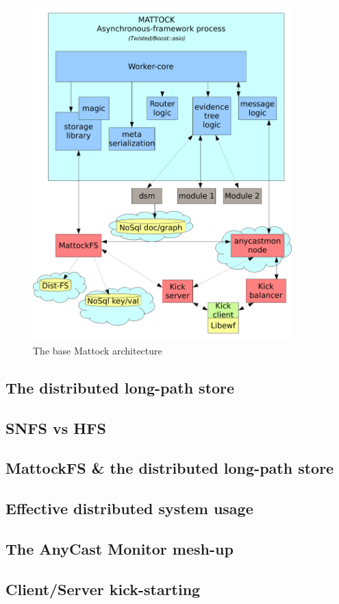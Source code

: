 \begin{figure}
\centering
\includegraphics[width=100mm]{mattock/libraryviewmattock.pdf}
\caption{The base Mattock architecture}
\label{fig:FlowInOut}
\end{figure}
\subsection{The distributed long-path store}
\subsection{SNFS vs HFS}
\subsection{MattockFS \& the distributed long-path store}
\subsection{Effective distributed system usage}
\subsection{The AnyCast Monitor mesh-up}
\subsection{Client/Server kick-starting}
